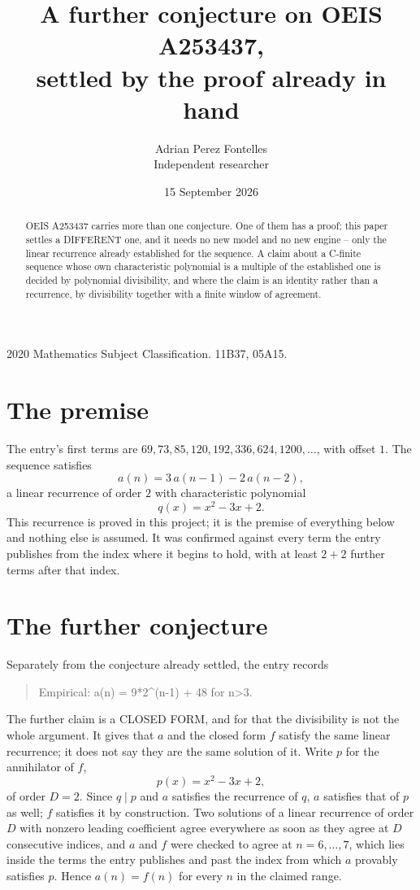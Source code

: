 \documentclass[11pt,a4paper]{article}
\title{A further conjecture on OEIS A253437,\\ \large settled by the proof already in hand}
\author{Adrian Perez Fontelles\\ \small Independent researcher}
\date{15 September 2026}
\theoremstyle{plain}
\theoremstyle{definition}
\begin{document}
\maketitle

\begin{abstract}
OEIS A253437 carries more than one conjecture. One of them has a proof; this paper settles a
DIFFERENT one, and it needs no new model and no new engine -- only the linear recurrence already
established for the sequence. A claim about a C-finite sequence whose own characteristic
polynomial is a multiple of the established one is decided by polynomial divisibility, and where
the claim is an identity rather than a recurrence, by divisibility together with a finite window
of agreement.
\end{abstract}

\noindent\small 2020 Mathematics Subject Classification. 11B37, 05A15.\normalsize

\section{The premise}

The entry's first terms are $69, 73, 85, 120, 192, 336, 624, 1200,\dots$, with offset $1$. The sequence satisfies
\[
  a(n)=3\,a(n-1) - 2\,a(n-2) ,
\]
a linear recurrence of order $2$ with characteristic polynomial
\[
  q(x)=x^{2} - 3 x + 2 .
\]
This recurrence is proved in this project; it is the premise of everything below and nothing else is assumed.
It was confirmed against every term the entry publishes from the index where it begins to hold,
with at least $2+2$ further terms after that index.

\section{The further conjecture}

Separately from the conjecture already settled, the entry records

\begin{quote}\raggedright Empirical: a(n) = 9*2\^{}(n-1) + 48 for n>3.\end{quote}

The further claim is a CLOSED FORM, and for that the divisibility is not the whole argument. It
gives that $a$ and the closed form $f$ satisfy the same linear recurrence; it does not say they
are the same solution of it. Write $p$ for the annihilator of $f$,
\[
  p(x)=x^{2} - 3 x + 2 ,
\]
of order $D=2$. Since $q\mid p$ and $a$ satisfies the recurrence of $q$, $a$ satisfies that of
$p$ as well; $f$ satisfies it by construction. Two solutions of a linear recurrence of order $D$
with nonzero leading coefficient agree everywhere as soon as they agree at $D$ consecutive
indices, and $a$ and $f$ were checked to agree at $n=6,\dots,7$,
which lies inside the terms the entry publishes and past the index from which $a$ provably
satisfies $p$. Hence $a(n)=f(n)$ for every $n$ in the claimed range.
\end{document}
